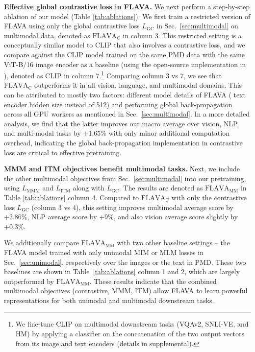 \documentclass[10pt,twocolumn,letterpaper]{article}
\newcommand{\myparagraph}[1]{\vspace{0.25em}\noindent\textbf{#1}}
\begin{document}
\myparagraph{Effective global contrastive loss in FLAVA.} We next perform a step-by-step ablation of our model (Table \ref{tab:ablations}). We first train a restricted version of FLAVA using only the global contrastive loss $L_{\mathrm{GC}}$ in Sec.~\ref{sec:multimodal} on multimodal data, denoted as $\mathrm{FLAVA}_\mathrm{C}$ in column 3. This restricted setting is a conceptually similar model to CLIP \cite{radford2021learning} that also involves a contrastive loss, and we compare against the CLIP model trained on the same PMD data with the same ViT-B/16 image encoder as a baseline (using the open-source implementation in \cite{ilharco_gabriel_2021_5143773}), denoted as $\mathrm{CLIP}$ in column 7.\footnote{We fine-tune CLIP on multimodal downstream tasks (VQAv2, SNLI-VE, and HM) by applying a classifier on the concatenation of the two output vectors from its image and text encoders (details in supplemental).} Comparing column 3 vs 7, we see that $\mathrm{FLAVA}_\mathrm{C}$ outperforms it in all vision, language, and multimodal domains. This can be attributed to mostly two factors: different model details of FLAVA ( text encoder hidden size instead of 512) and performing global back-propagation across all GPU workers as mentioned in Sec.~\ref{sec:multimodal}. In a more detailed analysis, we find that the latter improves our macro average over vision, NLP, and multi-modal tasks by +1.65\% with only minor additional computation overhead, indicating the global back-propagation implementation in contrastive loss are critical to effective pretraining.

\myparagraph{MMM and ITM objectives benefit multimodal tasks.} Next, we include the other multimodal objectives from Sec.~\ref{sec:multimodal} into our pretraining, using $L_{\mathrm{MMM}}$ and $L_{\mathrm{ITM}}$ along with $L_{\mathrm{GC}}$. The results are denoted as $\mathrm{FLAVA}_\mathrm{MM}$ in Table \ref{tab:ablations} column 4. Compared to $\mathrm{FLAVA}_\mathrm{C}$ with only the contrastive loss $L_{\mathrm{GC}}$ (column 3 vs 4), this setting improves multimodal average score by +2.86\%, NLP average score by +9\%, and also vision average score slightly by +0.3\%.

We additionally compare $\mathrm{FLAVA}_\mathrm{MM}$ with two other baseline settings -- the FLAVA model trained with only unimodal MIM or MLM losses in Sec.~\ref{sec:unimodal}, respectively over the images or the text in PMD. These two baselines are shown in Table~\ref{tab:ablations} column 1 and 2, which are largely outperformed by $\mathrm{FLAVA}_\mathrm{MM}$. These results indicate that the combined multimodal objectives (contrastive, MMM, ITM) allow FLAVA to learn powerful representations for both unimodal and multimodal downstream tasks.
\end{document}
